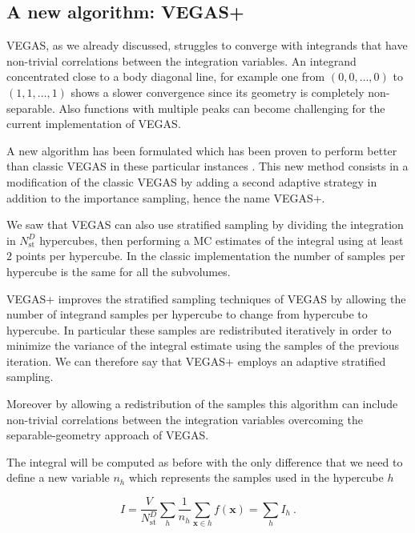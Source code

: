 \documentclass[../main/main.tex]{subfiles}
\begin{document}
\subsection{A new algorithm: VEGAS+}
\label{vegas+}
VEGAS, as we already discussed, struggles to converge with integrands that have non-trivial correlations between the integration variables. An integrand concentrated close to a body diagonal line, for example one from 
$(0,0,\dots,0)$ to $(1,1,\dots,1)$ shows a slower convergence since its geometry is completely non-separable. 
Also functions with multiple peaks can become challenging for the current implementation of VEGAS.

A new algorithm has been formulated which has been proven to perform better than classic VEGAS in these particular instances \cite{Lepage:2020tgj}.
This new method consists in a modification of the classic VEGAS by adding a second adaptive strategy in addition to the importance sampling, hence the name VEGAS+.

We saw that VEGAS can also use stratified sampling by dividing the integration in $N_\text{st}^D$ hypercubes, then performing a MC estimates of 
the integral using at least $2$ points per hypercube. In the classic implementation the number of samples per hypercube is the same for all the 
subvolumes.

VEGAS+ improves the stratified sampling techniques of VEGAS by allowing the number of integrand samples per hypercube to change from hypercube to hypercube. In particular these samples are redistributed iteratively in order to minimize the variance of the integral estimate using the 
samples of the previous iteration. We can therefore say that VEGAS+ employs an adaptive stratified sampling.

Moreover by allowing a redistribution of the samples this algorithm can include non-trivial correlations between the integration variables overcoming the separable-geometry approach of VEGAS.


The integral will be computed as before with the only difference that we need to define a new variable $n_h$ which represents the samples used 
in the hypercube $h$

\begin{equation}
	I = \frac{V}{N_\text{st}^D}\sum_h \frac{1}{n_h} \sum_{\textbf{x} \in h} f(\textbf{x})  = \sum_h I_h \ .
\end{equation}
\end{document}
